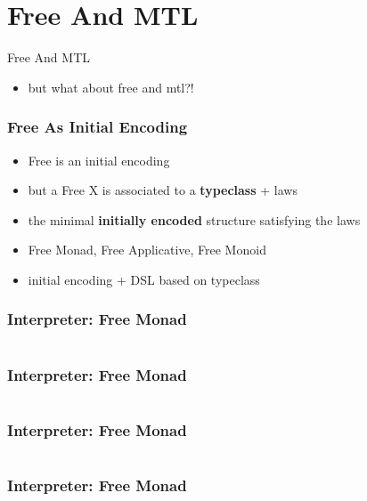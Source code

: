 \documentclass[aspectratio=169, hyperref={colorlinks, linkcolor=beamer@centricgreen}, urlcolor=links]{beamer}
\begin{document}
\section{Free And MTL}\label{sec:free-and-mtl}

\begin{frame}
  \begin{center}
    \Huge
    Free And MTL
  \end{center}
\end{frame}

\begin{frame}
  \begin{itemize}
  \item but what about free and mtl?!
  \end{itemize}
\end{frame}

\begin{frame}
  \frametitle{Free As Initial Encoding}
  \begin{itemize}
  \item Free is an initial encoding
  \item but a Free X is associated to a \textbf{typeclass} + laws
  \item the minimal \textbf{initially encoded} structure satisfying
    the laws
  \item Free Monad, Free Applicative, Free Monoid
  \item initial encoding + DSL based on typeclass
  \end{itemize}
\end{frame}

\begin{frame}
  \frametitle{Interpreter: Free Monad}
  \inputminted[fontsize=\footnotesize]{scala}{snippets/initial-free-expr.scala}
\end{frame}

\begin{frame}
  \frametitle{Interpreter: Free Monad}
  \inputminted[fontsize=\footnotesize]{scala}{snippets/initial-free-ctors.scala}
\end{frame}

\begin{frame}
  \frametitle{Interpreter: Free Monad}
  \inputminted[fontsize=\footnotesize]{scala}{snippets/initial-free-sample.scala}
\end{frame}

\begin{frame}
  \frametitle{Interpreter: Free Monad}
  \inputminted[fontsize=\footnotesize]{scala}{snippets/initial-free-interp.scala}
\end{frame}
\end{document}
